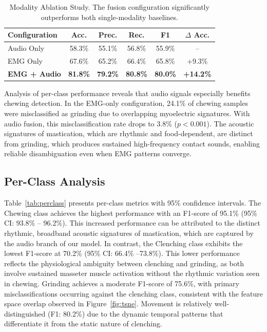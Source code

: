 \documentclass[acmtog, nonacm]{acmart}
\begin{document}
\begin{table}[h]
  \caption{Modality Ablation Study. The fusion configuration significantly outperforms both single-modality baselines.}
  \label{tab:modality_ablation}
  \begin{tabular}{lccccc}
    \toprule
    Configuration & Acc. & Prec. & Rec. & F1 & $\Delta$ Acc. \\
    \midrule
    Audio Only & 58.3\% & 55.1\% & 56.8\% & 55.9\% & -- \\
    EMG Only & 67.6\% & 65.2\% & 66.4\% & 65.8\% & +9.3\% \\
    \textbf{EMG + Audio} & \textbf{81.8\%} & \textbf{79.2\%} & \textbf{80.8\%} & \textbf{80.0\%} & \textbf{+14.2\%} \\
    \bottomrule
  \end{tabular}
\end{table}

Analysis of per-class performance reveals that audio signals especially benefits chewing detection. In the EMG-only configuration, 24.1\% of chewing samples were misclassified as grinding due to overlapping myoelectric signatures. With audio fusion, this misclassification rate drops to 3.8\% ($p < 0.001$). The acoustic signatures of mastication, which are rhythmic and food-dependent, are distinct from grinding, which produces sustained high-frequency contact sounds, enabling reliable disambiguation even when EMG patterns converge.

\subsection{Per-Class Analysis}



Table~\ref{tab:perclass} presents per-class metrics with 95\% confidence intervals. The Chewing class achieves the highest performance with an F1-score of 95.1\% (95\% CI: 93.8\% -- 96.2\%). This increased performance can be attributed to the distinct rhythmic, broadband acoustic signatures of mastication, which are captured by the audio branch of our model. 
In contrast, the Clenching class exhibits the lowest F1-score at 70.2\% (95\% CI: 66.4\% --73.8\%). This lower performance reflects the physiological ambiguity between clenching and grinding, as both involve sustained masseter muscle activation without the rhythmic variation seen in chewing. Grinding achieves a moderate F1-score of 75.6\%, with primary misclassifications occurring against the clenching class, consistent with the feature space overlap observed in Figure~\ref{fig:tsne}. Movement is relatively well-distinguished (F1: 80.2\%) due to the dynamic temporal patterns that differentiate it from the static nature of clenching.
\end{document}
